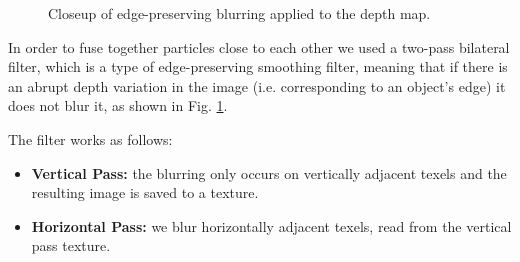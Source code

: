 \begin{figure}[ht!]
    \centering
        \hfill
    \caption{Closeup of edge-preserving blurring applied to the depth map.}\label{fig:blurdepth}
\end{figure}

\noindent
In order to fuse together particles close to each other we used a two-pass bilateral filter, which is a type of edge-preserving smoothing filter, meaning that if there is an abrupt depth variation in the image (i.e. corresponding to an object's edge) it does not blur it, as shown in Fig. \ref{fig:blurdepth}.

\noindent
The filter works as follows:
\begin{itemize}
    \item \textbf{Vertical Pass:} the blurring only occurs on vertically adjacent texels and the resulting image is saved to a texture.
    \item \textbf{Horizontal Pass:} we blur horizontally adjacent texels, read from the vertical pass texture.
\end{itemize}

